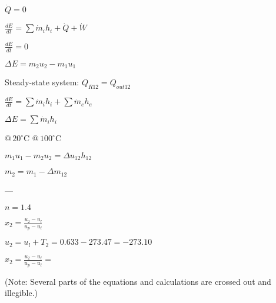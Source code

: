 \( \dot{Q} = 0 \)  

\( \frac{dE}{dt} = \sum \dot{m}_i h_i + \dot{Q} + \dot{W} \)  

\( \frac{dE}{dt} = 0 \)  

\( \Delta E = m_{2} u_{2} - m_{1} u_{1} \)  

Steady-state system:  
\( Q_{R12} = Q_{out12} \)  

\( \frac{dE}{dt} = \sum \dot{m}_i h_i + \sum \dot{m}_e h_e \)  

\( \Delta E = \sum \dot{m}_i h_i \)  

\( @ \, 20^\circ \text{C} \)  
\( @ \, 100^\circ \text{C} \)  

\( m_{1} u_{1} - m_{2} u_{2} = \Delta u_{12} h_{12} \)  

\( m_{2} = m_{1} - \Delta m_{12} \)  

---

\( n = 1.4 \)  

\( x_2 = \frac{u_2 - u_l}{u_p - u_l} \)  

\( u_2 = u_l + T_2 = 0.633 - 273.47 = -273.10 \)  

\( x_2 = \frac{u_2 - u_l}{u_p - u_l} = \)  

(Note: Several parts of the equations and calculations are crossed out and illegible.)